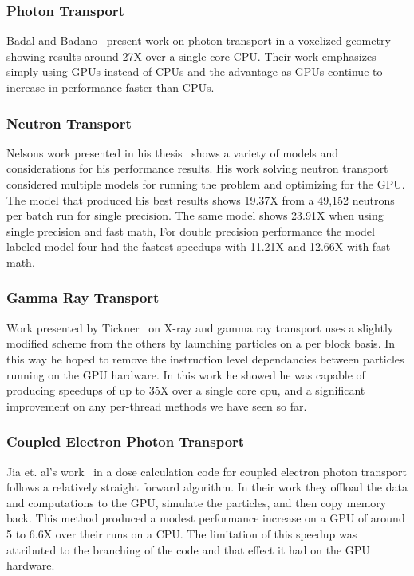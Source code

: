 \subsubsection*{\textbf{Photon Transport}}
%
Badal and Badano~\cite{badal2009accelerating} present work on photon transport in a voxelized geometry showing results around 27X over a single core CPU.
%
Their work emphasizes simply using GPUs instead of CPUs and the advantage as GPUs continue to increase in performance faster than CPUs.
%

\subsubsection*{\textbf{Neutron Transport}}
%
Nelsons work presented in his thesis~\cite{nelson2009monte} shows a variety of models and considerations for his performance results.
%
His work solving neutron transport considered multiple models for running the problem and optimizing for the GPU.
%
The model that produced his best results shows 19.37X from a 49,152 neutrons per batch run for single precision.
%
The same model shows 23.91X when using single precision and fast math,
%
For double precision performance the model labeled model four had the fastest speedups with 11.21X and 12.66X with fast math.
%

\subsubsection*{\textbf{Gamma Ray Transport}}
%
Work presented by Tickner~\cite{tickner2010monte} on X-ray and gamma ray transport uses a slightly modified scheme from the others by launching particles on a per block basis.
%
In this way he hoped to remove the instruction level dependancies between particles running on the GPU hardware.
%
In this work he showed he was capable of producing speedups of up to 35X over a single core cpu, and a significant improvement on any per-thread methods we have seen so far.
%

\subsubsection*{\textbf{Coupled Electron Photon Transport}}
%
Jia et. al's  work~\cite{jia2010development} in a dose calculation code for coupled electron photon transport follows a relatively straight forward algorithm.
%
In their work they offload the data and computations to the GPU, simulate the particles, and then copy memory back.
This method produced a modest performance increase on a GPU of around 5 to 6.6X over their runs on a CPU.
%
The limitation of this speedup was attributed to the branching of the code and that effect it had on the GPU hardware.

